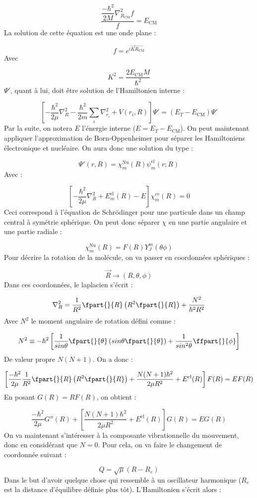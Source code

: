\[ \dfrac{\dfrac{-\hbar^2}{2M}\nabla^2_{R_\text{CM}}f}{f} = E_\text{CM} \]
La solution de cette équation est une onde plane :


\[ f = e^{i\Vec{K}\Vec{R_\text{CM}}} \]
Avec


\[ K^2 = \dfrac{2E_\text{CM}M}{\hbar^2} \]
$\Psi'$, quant à lui, doit être solution de l'Hamiltonien interne :


\[
    \left[-\dfrac{\hbar^2}{2\mu}\nabla^2_R - \dfrac{\hbar^2}{2m}\sum\limits_i \nabla^2_{r_{i}} + V(r_i, R)\right]\Psi' = (E_T-E_\text{CM})\Psi'
\]
Par la suite, on notera $E$ l'énergie interne ($E = E_T - E_\text{CM}$). On peut maintenant appliquer l'approximation de Born-Oppenheimer pour séparer les Hamiltoniens électronique et nucléaire. On aura donc une solution du type :


\[ \Psi'(r,R) = \chi^\text{Nu}_m(R)\psi^\text{el}_m(r;R) \]
Avec :


\[ \left[-\dfrac{\hbar^2}{2\mu}\nabla^2_R + E^\text{el}_m(R) - E\right] \chi^{rv}_m(R) = 0 \]
Ceci correspond à l'équation de Schrödinger pour une particule dans un champ central à symétrie sphérique. On peut donc séparer $\chi$ en une partie angulaire et une partie radiale :


\[ \chi^\text{Nu}_m(R) = F(R)Y^m_J(\theta\phi) \]
Pour décrire la rotation de la molécule, on va passer en coordonnées sphériques :


\[ \Vec{R} \rightarrow (R, \theta, \phi) \]
Dans ces coordonnées, le laplacien s'écrit :


\[ \nabla^2_R = \dfrac{1}{R^2}\fpart{}{R}\left(R^2\fpart{}{R}\right) + \dfrac{N^2}{\hbar^2R^2} \]
Avec $N^2$ le moment angulaire de rotation défini comme :


\[
    N^2 \equiv -\hbar^2\left[\dfrac{1}{sin\theta}\fpart{}{\theta}\left(sin\theta\fpart{}{\theta}\right) + \dfrac{1}{sin^2\theta}\ffpart{}{\phi}\right]
\]
De valeur propre $N(N+1)$. On a donc :


\[
    \left[\dfrac{-\hbar^2}{2\mu}\dfrac{1}{R^2}\fpart{}{R}\left(R^2\fpart{}{R}\right) + \dfrac{N(N+1)\hbar^2}{2\mu R^2} + E^\text{el}(R)\right]F(R) = EF(R)
\]
En posant $G(R) = RF(R)$, on obtient :


\[
    \dfrac{-\hbar^2}{2\mu}G''(R) + \left[\dfrac{N(N+1)\hbar^2}{2\mu R^2} + E^\text{el}(R)\right]G(R) = EG(R)
\]
On va maintenant s'intéresser à la composante vibrationnelle du mouvement, donc en considérant que $N = 0$. Pour cela, on va faire le changement de coordonnée suivant :


\[ Q = \sqrt{\mu}(R-R_e) \]
Dans le but d'avoir quelque chose qui ressemble à un oscillateur harmonique ($R_e$ est la distance d'équilibre définie plus tôt). L'Hamiltonien s'écrit alors :



